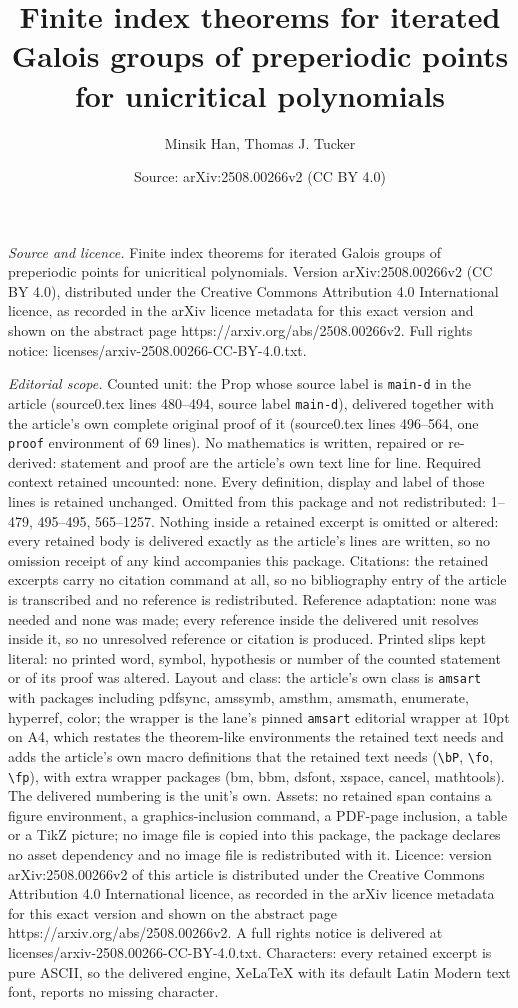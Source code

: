 \documentclass[10pt,a4paper]{amsart}
\title[Finite index theorems for iterated Galois groups of preperio]{Finite index theorems for iterated Galois groups of preperiodic points for unicritical polynomials}
\author{Minsik Han, Thomas J. Tucker}
\date{Source: arXiv:2508.00266v2 (CC BY 4.0)}
\begin{document}
\maketitle

\noindent\emph{Source and licence.} Finite index theorems for iterated Galois groups of preperiodic points for unicritical polynomials. Version arXiv:2508.00266v2 (CC BY 4.0), distributed under the Creative Commons Attribution 4.0 International licence, as recorded in the arXiv licence metadata for this exact version and shown on the abstract page https://arxiv.org/abs/2508.00266v2. Full rights notice: licenses/arxiv-2508.00266-CC-BY-4.0.txt.\par\smallskip

\noindent\textit{Editorial scope.} Counted unit: the Prop whose source label is \texttt{main-d} in the article (source0.tex lines 480--494, source label \texttt{main-d}), delivered together with the article's own complete original proof of it (source0.tex lines 496--564, one \texttt{proof} environment of 69 lines). No mathematics is written, repaired or re-derived: statement and proof are the article's own text line for line. Required context retained uncounted: none. Every definition, display and label of those lines is retained unchanged. Omitted from this package and not redistributed: 1--479, 495--495, 565--1257. Nothing inside a retained excerpt is omitted or altered: every retained body is delivered exactly as the article's lines are written, so no omission receipt of any kind accompanies this package. Citations: the retained excerpts carry no citation command at all, so no bibliography entry of the article is transcribed and no reference is redistributed. Reference adaptation: none was needed and none was made; every reference inside the delivered unit resolves inside it, so no unresolved reference or citation is produced. Printed slips kept literal: no printed word, symbol, hypothesis or number of the counted statement or of its proof was altered. Layout and class: the article's own class is \texttt{amsart} with packages including pdfsync, amssymb, amsthm, amsmath, enumerate, hyperref, color; the wrapper is the lane's pinned \texttt{amsart} editorial wrapper at 10pt on A4, which restates the theorem-like environments the retained text needs and adds the article's own macro definitions that the retained text needs (\texttt{\textbackslash bP}, \texttt{\textbackslash fo}, \texttt{\textbackslash fp}), with extra wrapper packages (bm, bbm, dsfont, xspace, cancel, mathtools). The delivered numbering is the unit's own. Assets: no retained span contains a figure environment, a graphics-inclusion command, a PDF-page inclusion, a table or a TikZ picture; no image file is copied into this package, the package declares no asset dependency and no image file is redistributed with it. Licence: version arXiv:2508.00266v2 of this article is distributed under the Creative Commons Attribution 4.0 International licence, as recorded in the arXiv licence metadata for this exact version and shown on the abstract page https://arxiv.org/abs/2508.00266v2. A full rights notice is delivered at licenses/arxiv-2508.00266-CC-BY-4.0.txt. Characters: every retained excerpt is pure ASCII, so the delivered engine, XeLaTeX with its default Latin Modern text font, reports no missing character.
\end{document}
